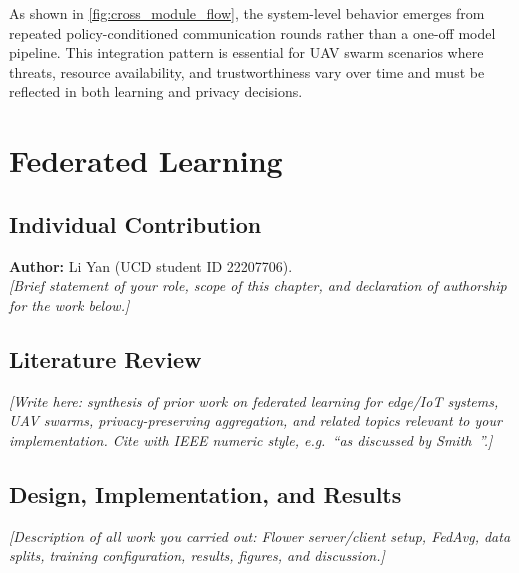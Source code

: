 \documentclass[11pt,a4paper,oneside]{report}
\begin{document}
As shown in \cref{fig:cross_module_flow}, the system-level behavior emerges from repeated policy-conditioned communication rounds rather than a one-off model pipeline. This integration pattern is essential for UAV swarm scenarios where threats, resource availability, and trustworthiness vary over time and must be reflected in both learning and privacy decisions.


\chapter{Federated Learning}
\label{ch:fl}

\section{Individual Contribution}
\label{sec:individual-li}
\noindent\textbf{Author:} Li Yan (UCD student ID 22207706).\\
\textit{[Brief statement of your role, scope of this chapter, and declaration of authorship for the work below.]}

\section{Literature Review}
\label{sec:lit-li}
\textit{[Write here: synthesis of prior work on federated learning for edge/IoT systems, UAV swarms, privacy-preserving aggregation, and related topics relevant to your implementation. Cite with IEEE numeric style, e.g.\ ``as discussed by Smith~\cite{smith2020}''.]}

\section{Design, Implementation, and Results}
\label{sec:fl-work}
\textit{[Description of all work you carried out: Flower server/client setup, FedAvg, data splits, training configuration, results, figures, and discussion.]}

\end{document}

